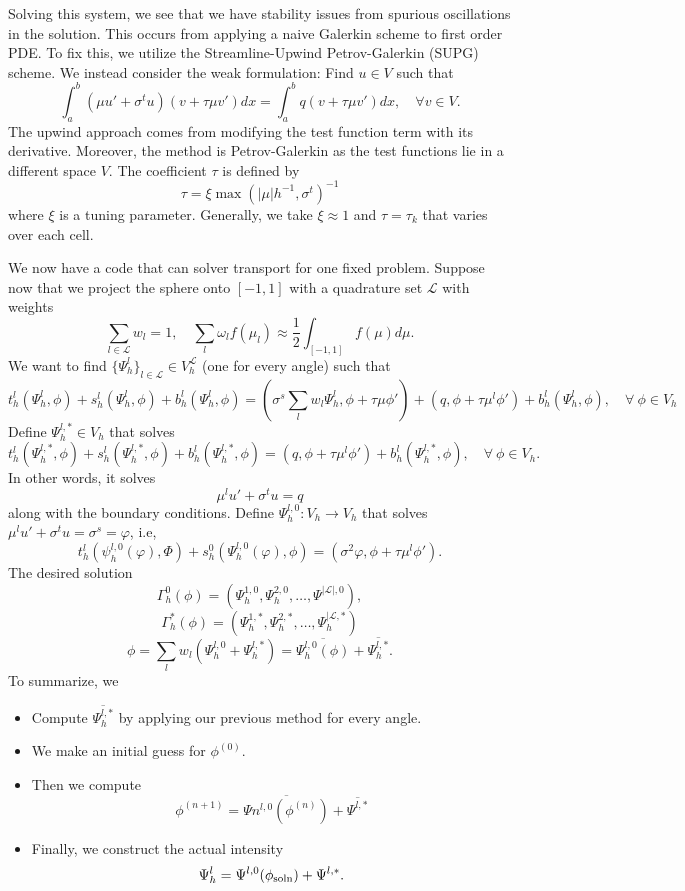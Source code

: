 \documentclass{article}
\theoremstyle{definition}
\theoremstyle{definition}
\begin{document}
Solving this system, we see that we have stability issues from spurious oscillations in the solution. This occurs from applying a naive Galerkin scheme to first order PDE. To fix this, we utilize the Streamline-Upwind Petrov-Galerkin (SUPG) scheme. We instead consider the weak formulation: Find $u\in V$ such that
$$\int_{a}^{b}(\mu u'+\sigma^tu)(v+\tau \mu v')dx=\int_{a}^{b}q(v+\tau\mu v')dx,\quad \forall v\in V.$$
The upwind approach comes from modifying the test function term with its derivative. Moreover, the method is Petrov-Galerkin as the test functions lie in a different space $V$. The coefficient $\tau$ is defined by
$$\tau=\xi \operatorname{max}(|\mu|h^{-1},\sigma^t)^{-1}$$
where $\xi$ is a tuning parameter. Generally, we take $\xi\approx 1$ and $\tau=\tau_k$ that varies over each cell.

We now have a code that can solver transport for one fixed problem. Suppose now that we project the sphere onto $[-1,1]$ with a quadrature set $\mathcal{L}$ with weights
$$\sum_{l\in \mathcal{L}}w_l=1,\quad \sum_{l}\omega_lf(\mu_l)\approx \frac{1}{2}\int_{[-1,1]}f(\mu)d\mu.$$
We want to find $\{\Psi^l_h\}_{l\in \mathcal{L}}\in V_h^{\mathcal{L}}$ (one for every angle) such that
$$t_h^l(\Psi^l_h,\phi)+s_h^l(\Psi^l_h,\phi)+b_h^{l}(\Psi^l_h,\phi)=(\sigma^s\sum_{l}w_l\Psi^l_h,\phi+\tau\mu\phi')+(q,\phi+\tau\mu^l\phi')+b_h^l(\Psi^l_h,\phi),\quad \forall\:\phi \in V_h$$
Define $\Psi_h^{l,*}\in V_h$ that solves
$$t_h^l(\Psi_h^{l,*},\phi)+s_h^l(\Psi_h^{l,*},\phi)+b_h^{l}(\Psi_h^{l,*},\phi)=(q,\phi+\tau\mu^l\phi')+b_h^l(\Psi_h^{l,*},\phi),\quad \forall\:\phi \in V_h.$$
In other words, it solves
$$\mu^lu'+\sigma^tu=q$$
along with the boundary conditions. Define $\Psi_h^{l,0}:V_h\to V_h$ that solves $\mu^lu'+\sigma^{t}u=\sigma^s=\varphi$, i.e,
$$t_h^{l}(\psi_h^{l,0}(\varphi),\Phi)+s_h^{0}(\Psi_h^{l,0}(\varphi),\phi)=(\sigma^2\varphi,\phi+\tau\mu^l\phi').$$
The desired solution
$$\Gamma_h^0(\phi)=(\Psi_h^{1,0},\Psi_h^{2,0},\ldots,\Psi^{|\mathcal{L}|,0}),$$
$$\Gamma_h^*(\phi)=(\Psi_h^{1,*},\Psi_h^{2,*},\ldots,\Psi_h^{|\mathcal{L},*})$$
$$\phi=\sum_{l}w_l(\Psi_h^{l,0}+\Psi_h^{l,*})=\overline{\Psi_h^{l,0}(\phi)}+\overline{\Psi_h^{l,*}}.$$
To summarize, we
\begin{itemize}
    \item Compute $\overline{\Psi_h^{l,*}}$ by applying our previous method for every angle.
    \item We make an initial guess for $\phi^{(0)}$.
    \item Then we compute
    $$\phi^{(n+1)}=\overline{\Psi{n}^{l,0}(\phi^{(n)})}+\overline{\Psi^{l,*}}$$
    \item Finally, we construct the actual intensity
    $$\Psi_h^{l}=\Psi^{l,0}(\phi_{\rm soln})+\Psi^{l,*}.$$
\end{itemize}
\end{document}
